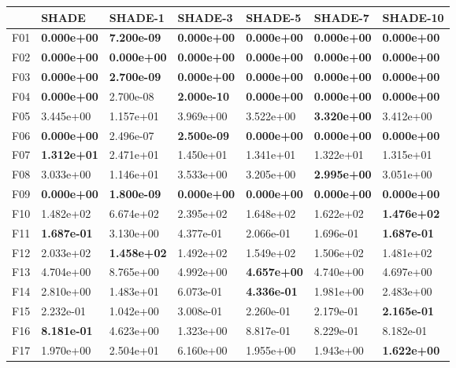 \begin{tabular}{lllllll}
\toprule
{} & SHADE & SHADE-1 & SHADE-3 & SHADE-5 & SHADE-7 & SHADE-10 \\
\midrule
F01 & \textbf{0.000e+00} & \textbf{7.200e-09} & \textbf{0.000e+00} & \textbf{0.000e+00} & \textbf{0.000e+00} & \textbf{0.000e+00} \\
F02 & \textbf{0.000e+00} & \textbf{0.000e+00} & \textbf{0.000e+00} & \textbf{0.000e+00} & \textbf{0.000e+00} & \textbf{0.000e+00} \\
F03 & \textbf{0.000e+00} & \textbf{2.700e-09} & \textbf{0.000e+00} & \textbf{0.000e+00} & \textbf{0.000e+00} & \textbf{0.000e+00} \\
F04 & \textbf{0.000e+00} & 2.700e-08 & \textbf{2.000e-10} & \textbf{0.000e+00} & \textbf{0.000e+00} & \textbf{0.000e+00} \\
F05 & 3.445e+00 & 1.157e+01 & 3.969e+00 & 3.522e+00 & \textbf{3.320e+00} & 3.412e+00 \\
F06 & \textbf{0.000e+00} & 2.496e-07 & \textbf{2.500e-09} & \textbf{0.000e+00} & \textbf{0.000e+00} & \textbf{0.000e+00} \\
F07 & \textbf{1.312e+01} & 2.471e+01 & 1.450e+01 & 1.341e+01 & 1.322e+01 & 1.315e+01 \\
F08 & 3.033e+00 & 1.146e+01 & 3.533e+00 & 3.205e+00 & \textbf{2.995e+00} & 3.051e+00 \\
F09 & \textbf{0.000e+00} & \textbf{1.800e-09} & \textbf{0.000e+00} & \textbf{0.000e+00} & \textbf{0.000e+00} & \textbf{0.000e+00} \\
F10 & 1.482e+02 & 6.674e+02 & 2.395e+02 & 1.648e+02 & 1.622e+02 & \textbf{1.476e+02} \\
F11 & \textbf{1.687e-01} & 3.130e+00 & 4.377e-01 & 2.066e-01 & 1.696e-01 & \textbf{1.687e-01} \\
F12 & 2.033e+02 & \textbf{1.458e+02} & 1.492e+02 & 1.549e+02 & 1.506e+02 & 1.481e+02 \\
F13 & 4.704e+00 & 8.765e+00 & 4.992e+00 & \textbf{4.657e+00} & 4.740e+00 & 4.697e+00 \\
F14 & 2.810e+00 & 1.483e+01 & 6.073e-01 & \textbf{4.336e-01} & 1.981e+00 & 2.483e+00 \\
F15 & 2.232e-01 & 1.042e+00 & 3.008e-01 & 2.260e-01 & 2.179e-01 & \textbf{2.165e-01} \\
F16 & \textbf{8.181e-01} & 4.623e+00 & 1.323e+00 & 8.817e-01 & 8.229e-01 & 8.182e-01 \\
F17 & 1.970e+00 & 2.504e+01 & 6.160e+00 & 1.955e+00 & 1.943e+00 & \textbf{1.622e+00} \\

\end{tabular}
